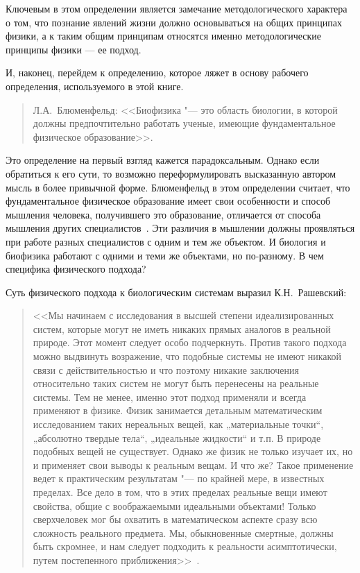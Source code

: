 \documentclass[12pt,a4paper,oneside]{book}
\begin{document}
Ключевым в этом определении является замечание методологического характера о том, что познание явлений жизни должно основываться на общих принципах физики, а к таким общим принципам относятся именно методологические принципы физики --- ее подход.

И, наконец, перейдем к определению, которое ляжет в основу рабочего определения, используемого в этой книге.
\begin{quote}
Л.А.~Блюменфельд: <<Биофизика "--- это область биологии, в которой должны предпочтительно работать ученые, имеющие фундаментальное физическое образование>>.
\end{quote}

Это определение на первый взгляд кажется парадоксальным. Однако если обратиться к его сути, то возможно переформулировать высказанную автором мысль в более привычной форме. Блюменфельд в этом определении считает, что фундаментальное физическое образование имеет свои особенности и способ мышления человека, получившего это образование, отличается от способа мышления других специалистов~\cite{Bartsev2010}. Эти различия в мышлении должны проявляться при работе разных специалистов с одним и тем же объектом. И биология и биофизика работают с одними и теми же объектами, но по-разному. В чем специфика физического подхода?

Суть физического подхода к биологическим системам выразил К.Н.~Рашевский:
\begin{quote}
<<Мы начинаем с исследования в высшей степени идеализированных систем, которые могут не иметь никаких прямых аналогов в реальной природе. Этот момент следует особо подчеркнуть. Против такого подхода можно выдвинуть возражение, что подобные системы не имеют никакой связи с действительностью и что поэтому никакие заключения относительно таких систем не могут быть перенесены на реальные системы. Тем не менее, именно этот подход применяли и всегда применяют в физике. Физик занимается детальным математическим исследованием таких нереальных вещей, как „материальные точки“, „абсолютно твердые тела“, „идеальные жидкости“ и т.п. В природе подобных вещей не существует. Однако же физик не только изучает их, но и применяет свои выводы к реальным вещам. И что же? Такое применение ведет к практическим результатам "--- по крайней мере, в известных пределах. Все дело в том, что в этих пределах реальные вещи имеют свойства, общие с воображаемыми идеальными объектами! Только сверхчеловек мог бы охватить в математическом аспекте сразу всю сложность реального предмета. Мы, обыкновенные смертные, должны быть скромнее, и нам следует подходить к реальности асимптотически, путем постепенного приближения>>~\cite{Uotermen1968}.
\end{quote}
\end{document}

